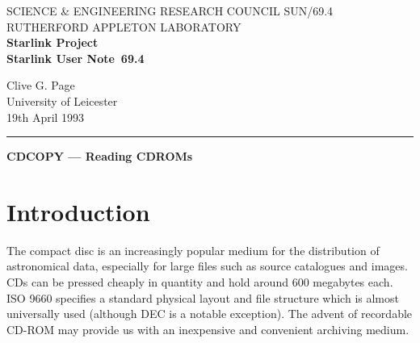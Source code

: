 \pagestyle{myheadings}

\newcommand{\stardoccategory}  {Starlink User Note}
\newcommand{\stardocinitials}  {SUN}
\newcommand{\stardocnumber}    {69.4}
\newcommand{\stardocauthors}   {Clive G. Page\\University of Leicester}
\newcommand{\stardocdate}      {19th April 1993}
\newcommand{\stardoctitle}     {CDCOPY --- Reading CDROMs}

\newcommand{\stardocname}{\stardocinitials /\stardocnumber}
\renewcommand{\_}{{\tt\char'137}}     %
\markright{\stardocname}
\setlength{\textwidth}{160mm}
\setlength{\textheight}{230mm}
\setlength{\topmargin}{-2mm}
\setlength{\oddsidemargin}{0mm}
\setlength{\evensidemargin}{0mm}
\setlength{\parindent}{0mm}
\setlength{\parskip}{\medskipamount}
\setlength{\unitlength}{1mm}



\thispagestyle{empty}
SCIENCE \& ENGINEERING RESEARCH COUNCIL \hfill \stardocname\\
RUTHERFORD APPLETON LABORATORY\\
{\large\bf Starlink Project\\}
{\large\bf \stardoccategory\ \stardocnumber}
\begin{flushright}
\stardocauthors\\
\stardocdate
\end{flushright}
\vspace{-4mm}
\rule{\textwidth}{0.5mm}
\vspace{5mm}
\begin{center}
{\Large\bf \stardoctitle}
\end{center}
\vspace{5mm}

\section{Introduction}

The compact disc is an increasingly popular medium for the distribution
of astronomical data, especially for large files such as source
catalogues and images. CDs can be pressed cheaply in quantity and hold
around 600 megabytes each.  ISO 9660 specifies a standard physical
layout and file structure which is almost universally used (although DEC
is a notable exception). The advent of recordable CD-ROM may provide us
with an inexpensive and convenient archiving medium.

